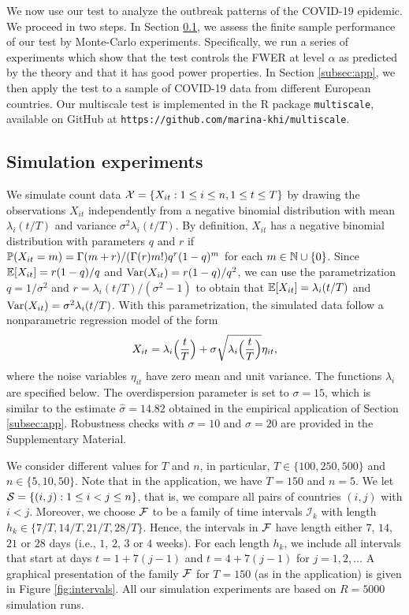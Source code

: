 \documentclass[a4paper,12pt]{article}
\numberwithin{equation}{section}
\begin{document}
We now use our test to analyze the outbreak patterns of the COVID-19 epidemic. We proceed in two steps. In Section \ref{subsec:sim}, we assess the finite sample performance of our test by Monte-Carlo experiments. Specifically, we run a series of experiments which show that the test controls the FWER at level $\alpha$ as predicted by the theory and that it has good power properties. In Section \ref{subsec:app}, we then apply the test to a sample of COVID-19 data from different European countries. Our multiscale test is implemented in the R package \verb|multiscale|, available on GitHub at \texttt{https://github.com/marina-khi/multiscale}.


\subsection{Simulation experiments}\label{subsec:sim}


We simulate count data $\mathcal{X} = \{ X_{it}: 1 \le i \le n, 1 \le t \le T \}$ by drawing the observations $X_{it}$ independently from a negative binomial distribution with mean $\lambda_i(t/T)$ and variance $\sigma^2 \lambda_i(t/T)$. By definition, $X_{it}$ has a negative binomial distribution with para\-meters $q$ and $r$ if $\mathbb{P}(X_{it} = m) = \Gamma(m+r) / (\Gamma(r) m!) q^r (1-q)^m$ for each $m \in \mathbb{N} \cup \{0\}$. Since $\mathbb{E}[X_{it}] = r (1-q)/q$ and $\textnormal{Var}(X_{it}) = r(1-q)/q^2$, we can use the parametrization $q = 1/\sigma^2$ and $r = \lambda_i(t/T) / (\sigma^2 - 1)$ to obtain that $\mathbb{E}[X_{it}] = \lambda_i(t/T)$ and $\textnormal{Var}(X_{it}) = \sigma^2 \lambda_i(t/T)$. With this parametrization, the simulated data follow a nonparametric regression model of the form 
\[ X_{it} = \lambda_i\Big(\frac{t}{T}\Big) + \sigma \sqrt{\lambda_i\Big(\frac{t}{T}\Big)} \eta_{it}, \]
where the noise variables $\eta_{it}$ have zero mean and unit variance. The functions $\lambda_i$ are specified below. The overdispersion parameter is set to $\sigma = 15$, which is similar to the estimate {\color{red}$\hat{\sigma} = 14.82$} obtained in the empirical application of Section \ref{subsec:app}. Robustness checks with $\sigma=10$ and $\sigma=20$ are provided in the Supplementary Material.


We consider different values for $T$ and $n$, in particular, $T \in \{100,250, 500\}$ and $n \in \{5,10,50\}$. Note that in the application, we have {\color{red}$T=150$} and $n=5$. We let $\mathcal{S} = \{ (i,j): 1 \le i < j \le n\}$, that is, we compare all pairs of countries $(i,j)$ with $i < j$. Moreover, we choose $\mathcal{F}$ to be a family of time intervals $\mathcal{I}_k$ with length $h_k \in \{ 7/T,14/T,21/T,28/T \}$. Hence, the intervals in $\mathcal{F}$ have length either $7$, $14$, $21$ or $28$ days (i.e., $1$, $2$, $3$ or $4$ weeks). For each length $h_k$, we include all intervals that start at days $t = 1 + 7(j-1)$ and $t = 4 + 7(j-1)$ for $j=1,2,\ldots$ A graphical presentation of the family $\mathcal{F}$ for {\color{red} $T = 150$} (as in the application) is given in Figure \ref{fig:intervals}. All our simulation experiments are based on $R=5000$ simulation runs. 
\end{document}
